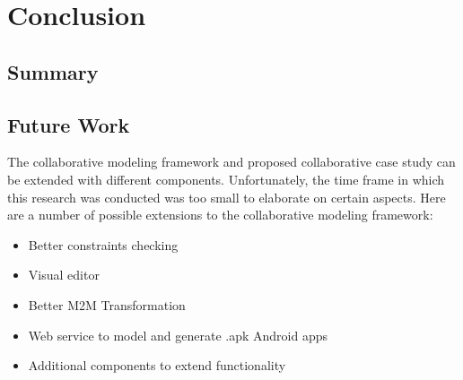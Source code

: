\chapter{Conclusion}

\section{Summary}

\section{Future Work}

The collaborative modeling framework and proposed collaborative case study can be extended with different components. Unfortunately, the time frame in which this research was conducted was too small to elaborate on certain aspects. Here are a number of possible extensions to the collaborative modeling framework:

\begin{itemize}
\item{Better constraints checking}
\item{Visual editor}
\item{Better M2M Transformation}
\item{Web service to model and generate .apk Android apps}
\item{Additional components to extend functionality}
\end{itemize}
